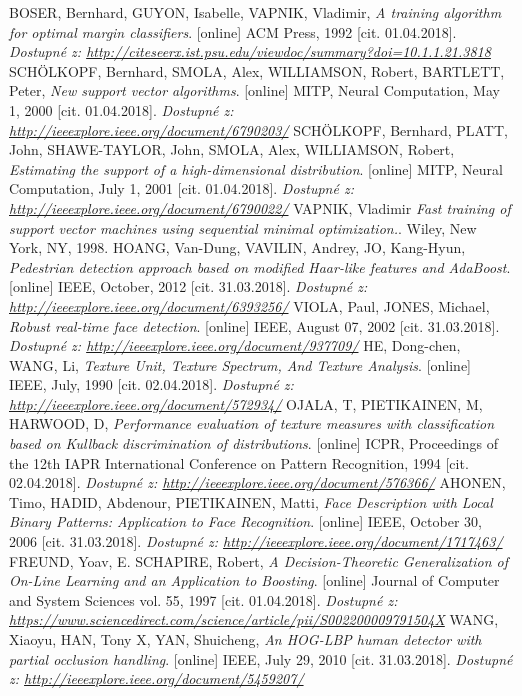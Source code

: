 \begin{thebibliography}{99}
	 BOSER, Bernhard, GUYON, Isabelle, VAPNIK, Vladimir, \textit{A training algorithm for optimal margin classifiers}. [online] ACM Press, 1992 [cit. 01.04.2018]. 
 	\textit{Dostupné z: \url{http://citeseerx.ist.psu.edu/viewdoc/summary?doi=10.1.1.21.3818}}
 	 SCHÖLKOPF, Bernhard, SMOLA, Alex, WILLIAMSON, Robert, BARTLETT, Peter, \textit{New support vector algorithms}. [online] MITP, Neural Computation, May 1, 2000 [cit. 01.04.2018]. 
 	\textit{Dostupné z: \url{http://ieeexplore.ieee.org/document/6790203/}}
 	 SCHÖLKOPF, Bernhard, PLATT, John, SHAWE-TAYLOR, John, SMOLA, Alex, WILLIAMSON, Robert, \textit{Estimating the support of a high-dimensional distribution}. [online] MITP, Neural Computation, July 1, 2001 [cit. 01.04.2018]. 
 	\textit{Dostupné z: \url{http://ieeexplore.ieee.org/document/6790022/}}
 	 VAPNIK, Vladimir \textit{Fast training of support vector machines using sequential minimal optimization.}. Wiley, New York, NY, 1998. 
 	 HOANG, Van-Dung, VAVILIN, Andrey, JO, Kang-Hyun, \textit{Pedestrian detection approach based on modified Haar-like features and AdaBoost}. [online] IEEE, October, 2012 [cit. 31.03.2018]. 
 		\textit{Dostupné z: \url{http://ieeexplore.ieee.org/document/6393256/}}
 	 VIOLA, Paul, JONES, Michael, \textit{Robust real-time face detection}. [online] IEEE, August 07, 2002 [cit. 31.03.2018]. 
 		\textit{Dostupné z: \url{http://ieeexplore.ieee.org/document/937709/}}
 	 HE, Dong-chen, WANG, Li, \textit{Texture Unit, Texture Spectrum, And Texture Analysis}. [online] IEEE, July, 1990 [cit. 02.04.2018]. 
 		\textit{Dostupné z: \url{http://ieeexplore.ieee.org/document/572934/}}
 	 OJALA, T, PIETIKAINEN, M, HARWOOD, D, \textit{Performance evaluation of texture measures with classification based on Kullback discrimination of distributions}. [online] ICPR, Proceedings of the 12th IAPR International Conference on Pattern Recognition, 1994 [cit. 02.04.2018]. 
 		\textit{Dostupné z: \url{http://ieeexplore.ieee.org/document/576366/}}
	 AHONEN, Timo, HADID, Abdenour, PIETIKAINEN, Matti, \textit{Face Description with Local Binary Patterns: Application to Face Recognition}. [online] IEEE, October 30, 2006 [cit. 31.03.2018]. 
 		\textit{Dostupné z: \url{http://ieeexplore.ieee.org/document/1717463/}}
 	 FREUND, Yoav, E. SCHAPIRE, Robert, \textit{A Decision-Theoretic Generalization of On-Line Learning and an Application to Boosting}. [online] Journal of Computer and System Sciences vol. 55, 1997 [cit. 01.04.2018]. 
 		\textit{Dostupné z: \url{https://www.sciencedirect.com/science/article/pii/S002200009791504X}}
 	 WANG, Xiaoyu, HAN, Tony X, YAN, Shuicheng, \textit{An HOG-LBP human detector with partial occlusion handling}. [online] IEEE, July 29, 2010 [cit. 31.03.2018]. 
 	\textit{Dostupné z: \url{http://ieeexplore.ieee.org/document/5459207/}}


\end{thebibliography}
